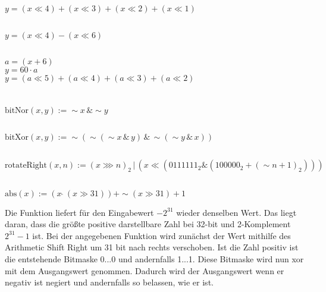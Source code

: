 \documentclass[10pt,a4paper,oneside,ngerman,numbers=noenddot]{scrartcl}
\begin{document}
\subsection{} %
$y = (x \ll 4) + (x \ll 3) + (x \ll 2) + (x \ll 1)$
\subsection{} %
$y = (x \ll 4) - (x \ll 6)$
\subsection{} %
$a = (x+6)$\\
$y = 60 \cdot a$\\
$y = (a \ll 5) + (a \ll 4) + (a \ll 3) + (a \ll 2)$\\
\section{}%
\subsection{} %
$\text{bitNor}(x,y) := \sim x \, \& \sim y$
\subsection{} %
$\text{bitXor}(x,y) := \sim(\sim(\sim x \,\&\, y) \,\&\, \sim(\sim y \,\&\, x))$
\subsection{} %
$\text{rotateRight}(x,n) := (x\ggg n)_{2} \,|\, (x\ll (0111111_{2} \& (100000_{2} + (\sim n + 1)_{2})))$
\subsection{} %
$\text{abs}(x) := (x \: \hat{} \: (x \gg 31)) + \sim (x \gg 31) + 1$ %

Die Funktion liefert für den Eingabewert $-2^{31}$ wieder denselben Wert. Das liegt daran, dass die größte positive darstellbare Zahl bei 32-bit und 2-Komplement $2^{31}-1$ ist. Bei der angegebenen Funktion wird zunächst der Wert mithilfe des Arithmetic Shift Right um 31 bit nach rechts verschoben. Ist die Zahl positiv ist die entstehende Bitmaske 0...0 und andernfalls 1...1. Diese Bitmaske wird nun xor mit dem Ausgangswert genommen. Dadurch wird der Ausgangswert wenn er negativ ist negiert und andernfalls so belassen, wie er ist.
\end{document}
